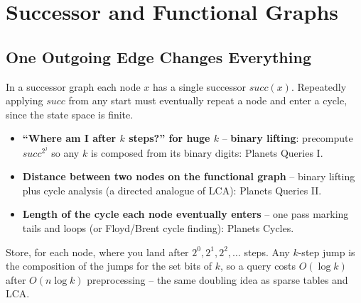 \chapter{Successor and Functional Graphs}

\section{One Outgoing Edge Changes Everything}
\label{sec:cses-graph-functional-intro}

In a successor graph each node $x$ has a single successor
$\textit{succ}(x)$. Repeatedly applying $\textit{succ}$ from any start must
eventually repeat a node and enter a cycle, since the state space is
finite.

\begin{patternbox}
\begin{itemize}
  \item \textbf{``Where am I after $k$ steps?'' for huge $k$} --
        \textbf{binary lifting}: precompute $\textit{succ}^{2^j}$ so any
        $k$ is composed from its binary digits: Planets Queries I.
  \item \textbf{Distance between two nodes on the functional graph} --
        binary lifting plus cycle analysis (a directed analogue of LCA):
        Planets Queries II.
  \item \textbf{Length of the cycle each node eventually enters} --
        one pass marking tails and loops (or Floyd/Brent cycle finding):
        Planets Cycles.
  \end{itemize}
\end{patternbox}

\begin{ideabox}
Store, for each node, where you land after $2^0,2^1,2^2,\ldots$ steps.
Any $k$-step jump is the composition of the jumps for the set bits of $k$,
so a query costs $O(\log k)$ after $O(n\log k)$ preprocessing -- the same
doubling idea as sparse tables and LCA.
\end{ideabox}

\newpage




